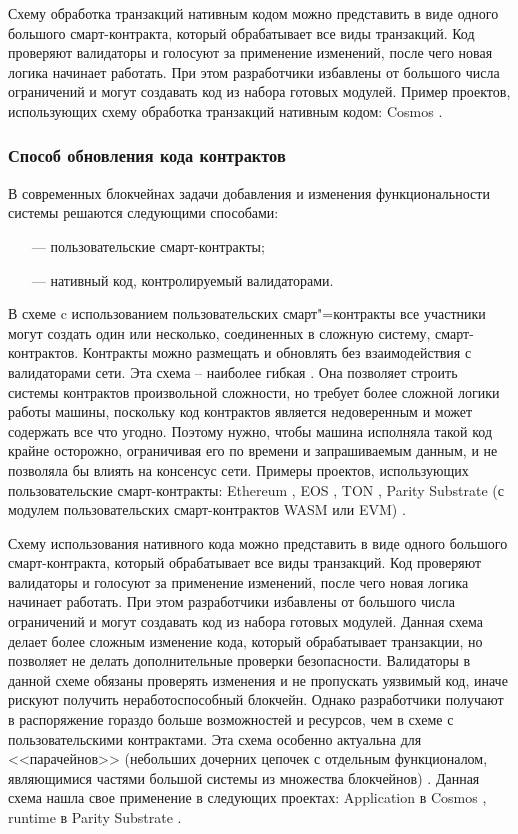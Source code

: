 Схему обработка транзакций нативным кодом можно представить в виде одного большого смарт-контракта, который обрабатывает все виды транзакций. Код проверяют валидаторы и голосуют за применение изменений, после чего новая логика начинает работать. При этом разработчики избавлены от большого числа ограничений и могут создавать код из набора готовых модулей. Пример проектов, использующих схему обработка транзакций нативным кодом: Cosmos \cite{cosmos}.



\subsubsection{Способ обновления кода контрактов}

В современных блокчейнах задачи добавления и изменения функциональности системы решаются следующими способами:
\begin{itemize}[leftmargin=1.6\parindent]
	\item[---] пользовательские смарт-контракты;
	\item[---] нативный код, контролируемый валидаторами.
\end{itemize}

В схеме c использованием пользовательских смарт"=контракты все участники могут создать один или несколько, соединенных в сложную систему, смарт-контрактов. Контракты можно размещать и обновлять без взаимодействия с валидаторами сети. Эта схема -- наиболее гибкая \cite{ru-bchain3}. Она позволяет строить системы контрактов произвольной сложности, но требует более сложной логики работы машины, поскольку код контрактов является недоверенным и может содержать все что угодно. Поэтому нужно, чтобы машина исполняла такой код крайне осторожно, ограничивая его по времени и запрашиваемым данным, и не позволяла бы влиять на консенсус сети. Примеры проектов, использующих пользовательские смарт-контракты: Ethereum \cite{evm}, EOS \cite{eos}, TON \cite{tvm}, Parity Substrate (с модулем пользовательских смарт-контрактов WASM или EVM) \cite{substrate}.


Схему использования нативного кода можно представить в виде одного большого смарт-контракта, который обрабатывает все виды транзакций. Код проверяют валидаторы и голосуют за применение изменений, после чего новая логика начинает работать. При этом разработчики избавлены от большого числа ограничений и могут создавать код из набора готовых модулей. Данная схема делает более сложным изменение кода, который обрабатывает транзакции, но позволяет не делать дополнительные проверки безопасности. Валидаторы в данной схеме обязаны проверять изменения и не пропускать уязвимый код, иначе рискуют получить неработоспособный блокчейн. Однако разработчики получают в распоряжение гораздо больше возможностей и ресурсов, чем в схеме с пользовательскими контрактами. Эта схема особенно актуальна для <<парачейнов>> (небольших дочерних цепочек с отдельным функционалом, являющимися частями большой системы из множества блокчейнов) \cite{parachain}. Данная схема нашла свое применение в следующих проектах: Application в Cosmos \cite{cosmos}, runtime в Parity Substrate \cite{substrate}.


